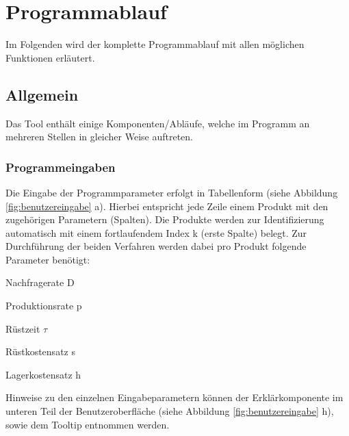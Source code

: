 \section{Programmablauf}
\label{ch:programmablauf}
Im Folgenden wird der komplette Programmablauf mit allen möglichen Funktionen erläutert.

\subsection{Allgemein}
Das Tool enthält einige Komponenten/Abläufe, welche im Programm an mehreren Stellen in gleicher Weise auftreten.

\subsubsection{Programmeingaben}
\label{ch:programmeingaben}
Die Eingabe der Programmparameter erfolgt in Tabellenform (siehe Abbildung \ref{fig:benutzereingabe} a). Hierbei entspricht jede Zeile einem Produkt mit den zugehörigen Parametern (Spalten). Die Produkte werden zur Identifizierung automatisch mit einem fortlaufendem Index k (erste Spalte) belegt. Zur Durchführung der beiden Verfahren werden dabei pro Produkt folgende Parameter benötigt:
\begin{compactitem}
	\item Nachfragerate D
	\item Produktionsrate p
	\item Rüstzeit $\tau$
	\item Rüstkostensatz s
	\item Lagerkostensatz h
\end{compactitem}
Hinweise zu den einzelnen Eingabeparametern können der Erklärkomponente im unteren Teil der Benutzeroberfläche (siehe Abbildung \ref{fig:benutzereingabe} h), sowie dem Tooltip entnommen werden.

